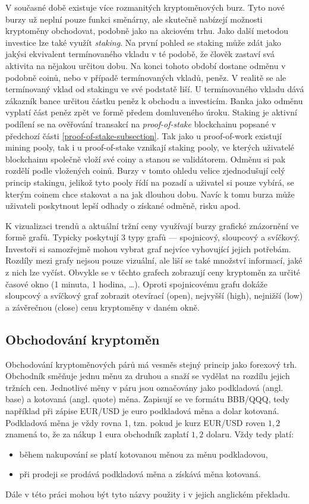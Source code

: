 V současné době existuje více rozmanitých kryptoměnových burz. Tyto nové burzy už neplní pouze funkci směnárny, ale skutečně nabízejí možnosti
kryptoměny obchodovat, podobně jako na akciovém trhu. Jako další metodou investice lze také využít \emph{staking}. Na první pohled se staking
může zdát jako jakýsi ekvivalent termínovaného vkladu v té podobě, že člověk zastaví svá aktivita na nějakou určitou dobu. Na konci tohoto období dostane
odměnu v podobně coinů, nebo v případě termínovaných vkladů, peněz. V realitě se ale termínovaný vklad od stakingu ve své podstatě liší. U termínovaného
vkladu dává zákazník bance určitou částku peněz k obchodu a investicím. Banka jako odměnu vyplatí část peněz zpět ve formě předem domluveného úroku.
Staking je aktivní podílení se na ověřování transakcí na \emph{proof-of-stake} blockchainu popsané v předchozí části
\ref{proof-of-stake-subsection}. Tak jako u proof-of-work existují mining pooly, tak i u proof-of-stake vznikají staking pooly, ve kterých uživatelé
blockchainu společně vloží své coiny a stanou se validátorem. Odměnu si pak rozdělí podle vložených coinů. Burzy v tomto ohledu velice zjednodušují
celý princip stakingu, jelikož tyto pooly řídí na pozadí a uživatel si pouze vybírá, se kterým coinem chce stakovat a na jak dlouhou dobu. Navíc k tomu
burza může uživateli poskytnout lepší odhady o získané odměně, risku apod.

K vizualizaci trendů a aktuální tržní ceny využívají burzy grafické znázornění ve formě grafů. Typicky poskytují 3 typy grafů --- spojnicový, sloupcový a svíčkový.
Investoři si samozřejmě mohou vybrat graf nejvíce vyhovující jejich potřebám. Rozdíly mezi grafy nejsou pouze vizuální, ale liší se také množství informací, jaké z nich lze vyčíst.
Obvykle se v těchto grafech zobrazují ceny kryptoměn za určité časové okno (1 minuta, 1 hodina, \ldots). Oproti spojnicovému grafu dokáže sloupcový a svíčkový graf
zobrazit otevírací (open), nejvyšší (high), nejnižší (low) a závěrečnou (close) cenu kryptoměny v daném okně.

\subsection{Obchodování kryptoměn}
Obchodování kryptoměnových párů má vesměs stejný princip jako forexový trh. Obchodník směňuje jednu měnu za druhou a snaží se vydělat na rozdílu jejich tržních cen.
Jednotlivé měny v páru jsou označovány jako podkladová (angl. base) a kotovaná (angl. quote) měna. Zapisují se ve formátu {BBB/QQQ}, tedy například při zápise
EUR/USD je euro podkladová měna a dolar kotovaná. Podkladová měna je vždy rovna 1, tzn. pokud je kurz EUR/USD roven $1,2$ znamená to, že za nákup 1 eura
obchodník zaplatí $1,2$ dolaru. Vždy tedy platí:
\begin{itemize}
    \item během nakupování se platí kotovanou měnou za měnu podkladovou,
    \item při prodeji se prodává podkladová měna a získává měna kotovaná.
\end{itemize}
Dále v této práci mohou být tyto názvy použity i v jejich anglickém překladu.



